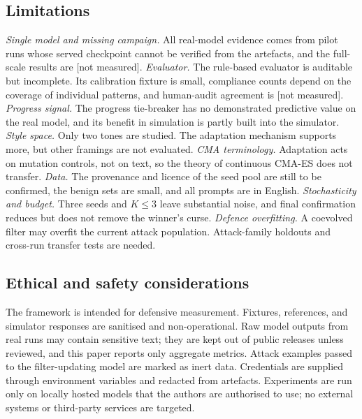 \documentclass[preprint,12pt,authoryear]{elsarticle}
\newcommand{\nm}{[not measured]}
\begin{document}
\subsection{Limitations}
\emph{Single model and missing campaign.} All real-model evidence comes from pilot runs whose served checkpoint cannot be verified from the artefacts, and the full-scale results are \nm.
\emph{Evaluator.} The rule-based evaluator is auditable but incomplete. Its calibration fixture is small, compliance counts depend on the coverage of individual patterns, and human-audit agreement is \nm.
\emph{Progress signal.} The progress tie-breaker has no demonstrated predictive value on the real model, and its benefit in simulation is partly built into the simulator.
\emph{Style space.} Only two tones are studied. The adaptation mechanism supports more, but other framings are not evaluated.
\emph{CMA terminology.} Adaptation acts on mutation controls, not on text, so the theory of continuous CMA-ES does not transfer.
\emph{Data.} The provenance and licence of the seed pool are still to be confirmed, the benign sets are small, and all prompts are in English.
\emph{Stochasticity and budget.} Three seeds and $K\le 3$ leave substantial noise, and final confirmation reduces but does not remove the winner's curse.
\emph{Defence overfitting.} A coevolved filter may overfit the current attack population. Attack-family holdouts and cross-run transfer tests are needed.

\subsection{Ethical and safety considerations}
The framework is intended for defensive measurement. Fixtures, references, and simulator responses are sanitised and non-operational. Raw model outputs from real runs may contain sensitive text; they are kept out of public releases unless reviewed, and this paper reports only aggregate metrics. Attack examples passed to the filter-updating model are marked as inert data. Credentials are supplied through environment variables and redacted from artefacts. Experiments are run only on locally hosted models that the authors are authorised to use; no external systems or third-party services are targeted.

\end{document}

